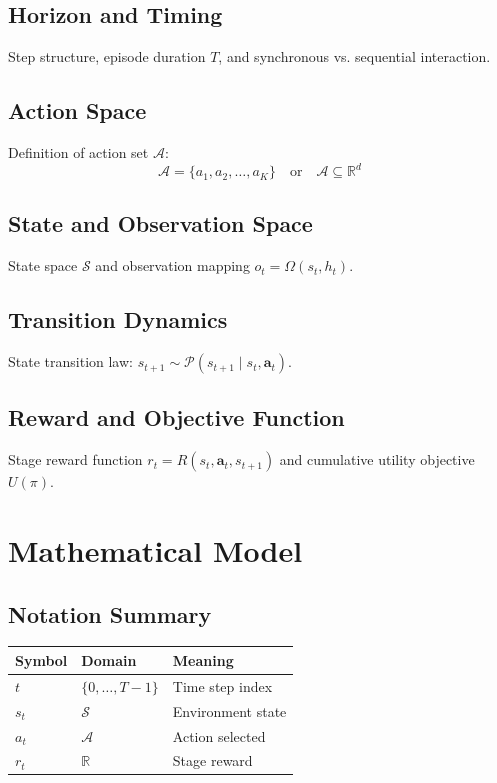 \documentclass[11pt,a4paper]{article}
\begin{document}
\subsection{Horizon and Timing}
Step structure, episode duration $T$, and synchronous vs. sequential interaction.

\subsection{Action Space}
Definition of action set $\mathcal{A}$:
\[
\mathcal{A} = \{a_1, a_2, \dots, a_K\} \quad \text{or} \quad \mathcal{A} \subseteq \mathbb{R}^d
\]

\subsection{State and Observation Space}
State space $\mathcal{S}$ and observation mapping $o_t = \Omega(s_t, h_t)$.

\subsection{Transition Dynamics}
State transition law: $s_{t+1} \sim \mathcal{P}(s_{t+1} \mid s_t, \mathbf{a}_t)$.

\subsection{Reward and Objective Function}
Stage reward function $r_t = R(s_t, \mathbf{a}_t, s_{t+1})$ and cumulative utility objective $U(\pi)$.


\section{Mathematical Model}

\subsection{Notation Summary}

\begin{tabularx}{\textwidth}{llX}
\toprule
\textbf{Symbol} & \textbf{Domain} & \textbf{Meaning} \\
\midrule
$t$ & $\{0, \dots, T-1\}$ & Time step index \\
$s_t$ & $\mathcal{S}$ & Environment state \\
$a_t$ & $\mathcal{A}$ & Action selected \\
$r_t$ & $\mathbb{R}$ & Stage reward \\
\bottomrule
\end{tabularx}
\end{document}
